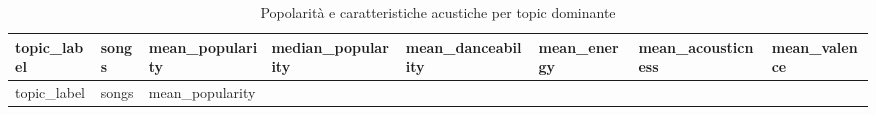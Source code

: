 \documentclass[
]{article}
\begin{document}
\begin{longtable}[]{@{}
  >{\raggedright\arraybackslash}p{}
  >{\raggedleft\arraybackslash}p{}
  >{\raggedleft\arraybackslash}p{}
  >{\raggedleft\arraybackslash}p{}
  >{\raggedleft\arraybackslash}p{}
  >{\raggedleft\arraybackslash}p{}
  >{\raggedleft\arraybackslash}p{}
  >{\raggedleft\arraybackslash}p{}@{}}
\caption{Popolarità e caratteristiche acustiche per topic
dominante}\tabularnewline
\toprule\noalign{}
\begin{minipage}[b]{\linewidth}\raggedright
topic\_label
\end{minipage} & \begin{minipage}[b]{\linewidth}\raggedleft
songs
\end{minipage} & \begin{minipage}[b]{\linewidth}\raggedleft
mean\_popularity
\end{minipage} & \begin{minipage}[b]{\linewidth}\raggedleft
median\_popularity
\end{minipage} & \begin{minipage}[b]{\linewidth}\raggedleft
mean\_danceability
\end{minipage} & \begin{minipage}[b]{\linewidth}\raggedleft
mean\_energy
\end{minipage} & \begin{minipage}[b]{\linewidth}\raggedleft
mean\_acousticness
\end{minipage} & \begin{minipage}[b]{\linewidth}\raggedleft
mean\_valence
\end{minipage} \\
\midrule\noalign{}
\endfirsthead
\toprule\noalign{}
\begin{minipage}[b]{\linewidth}\raggedright
topic\_label
\end{minipage} & \begin{minipage}[b]{\linewidth}\raggedleft
songs
\end{minipage} & \begin{minipage}[b]{\linewidth}\raggedleft
mean\_popularity
\end{minipage} & \begin{minipage}[b]{\linewidth}\raggedleft

\end{minipage}
\end{longtable}
\end{document}
